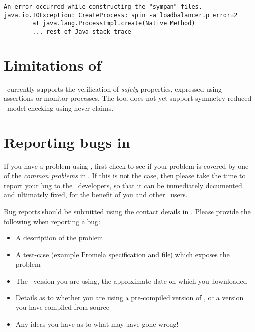 \exampleerrormessage

\begin{lstlisting}
An error occurred while constructing the "sympan" files.
java.io.IOException: CreateProcess: spin -a loadbalancer.p error=2
        at java.lang.ProcessImpl.create(Native Method)
        ... rest of Java stack trace
\end{lstlisting}



%
%
%
%

\section{Limitations of \protect\topspin}
%
\topspin\ currently supports the verification of \emph{safety}
properties, expressed using assertions or monitor processes.  The
tool does not yet support symmetry-reduced \ltl\ model checking
using never claims.
%
\section{Reporting bugs in \protect\topspin}
%
If you have a problem using \topspin, first check to see if your
problem is covered by one of the \emph{common problems} in \secref{
}.  If this is not the case, then please take the time to report
your bug to the \topspin\ developers, so that it can be immediately
documented and ultimately fixed, for the benefit of you and other
\topspin\ users.

Bug reports should be submitted using the contact details in
.  Please provide the
following when reporting a bug:

\begin{itemize}
\item A description of the problem
\item A test-case (example Promela specification and  file) which exposes the problem
\item The \topspin\ version you are using, the approximate date on which you downloaded \topspin
\item Details as to whether you are using a pre-compiled version of \topspin, or a version you have compiled from source
\item Any ideas you have as to what may have gone wrong!
\end{itemize}

